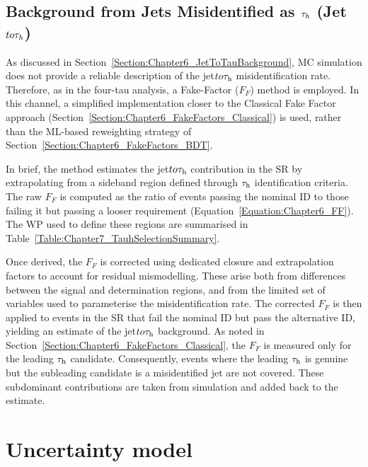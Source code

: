 \subsection{\texorpdfstring{Background from Jets Misidentified as $\tau_h$ (Jet $to \tau_h$)}{Background from Jets Misidentified as hadronic taus}}
\label{Section:Chapter7_FF}

As discussed in Section~\ref{Section:Chapter6_JetToTauBackground}, MC simulation does not provide a reliable description of the jet$to\tau_\mathrm{h}$ misidentification rate. Therefore, as in the four-tau analysis, a Fake-Factor ($F_F$) method is employed. In this channel, a simplified implementation closer to the Classical Fake Factor approach (Section~\ref{Section:Chapter6_FakeFactors_Classical}) is used, rather than the \ac{ML}-based reweighting strategy of Section~\ref{Section:Chapter6_FakeFactors_BDT}. 

In brief, the method estimates the jet$to\tau_\mathrm{h}$ contribution in the \ac{SR} by extrapolating from a sideband region defined through $\tau_\mathrm{h}$ identification criteria. The raw $F_F$ is computed as the ratio of events passing the nominal ID to those failing it but passing a looser requirement (Equation~\ref{Equation:Chapter6_FF}). The \ac{WP} used to define these regions are summarised in Table~\ref{Table:Chapter7_TauhSelectionSummary}.

Once derived, the $F_F$ is corrected using dedicated closure and extrapolation factors to account for residual mismodelling. These arise both from differences between the signal and determination regions, and from the limited set of variables used to parameterise the misidentification rate. The corrected $F_F$ is then applied to events in the \ac{SR} that fail the nominal ID but pass the alternative ID, yielding an estimate of the jet$to\tau_\mathrm{h}$ background. As noted in Section~\ref{Section:Chapter6_FakeFactors_Classical}, the $F_F$ is measured only for the leading $\tau_\mathrm{h}$ candidate. Consequently, events where the leading $\tau_\mathrm{h}$ is genuine but the subleading candidate is a misidentified jet are not covered. These subdominant contributions are taken from simulation and added back to the estimate.

\section{Uncertainty model}








